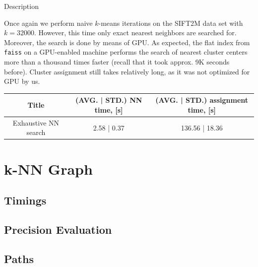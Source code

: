 \begin{frame}

\begin{block}{Description}

Once again we perform naive $k$-means iterations on the SIFT2M data set with $k = 32000$. However, this time only exact nearest neighbors are searched for. Moreover, the search is done by means of GPU. As expected, the flat index from \texttt{faiss} on a GPU-enabled machine performs the search of nearest cluster centers more than a thousand times faster (recall that it took approx. 9K seconds before). Cluster assignment still takes relatively long, as it was not optimized for GPU by us.
	
\end{block}


	\begin{table}
		\small
		\begin{tabular}{| c || c | c |}
			\hline
			Title & (AVG. | STD.) NN time, [s] & (AVG. | STD.) assignment time, [s] \\
			\hline
			\hline			
			Exhaustive NN search& 2.58 | 0.37 & 136.56 | 18.36 \\
			\hline  
		\end{tabular}
	\end{table}
\end{frame}


\section{k-NN Graph}
\subsection{Timings}


\begin{frame}
	
\end{frame}


\subsection{Precision Evaluation}


\begin{frame}
	
\end{frame}


\subsection{Paths}


